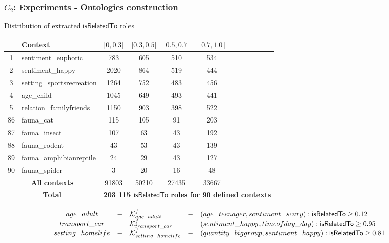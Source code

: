 \begin{frame}
	\frametitle{$C_{2}$: Experiments - Ontologies construction}
	\begin{exampleblock}{Distribution of extracted $\mathsf{isRelatedTo}$ roles}
		 \centering \tiny
		\begin{tabular}{c l c c c c c c c c c c} \hline
		~&\textbf{Context}& $[0, 0.3[$ & $[0.3, 0.5[$ & $[0.5, 0.7[$ & $[0.7, 1.0]$ \\ 
		\hline
			1&sentiment\_euphoric	&783	&605	&510	&534\\
			2&sentiment\_happy		&2020	&864	&519	&444\\
			3&setting\_sportsrecreation&1264	&752	&483	&456\\ 
			4&age\_child		&1045	&649	&493	&441\\ 
			5&relation\_familyfriends	&1150	&903	&398	&522\\ \hline
			86&fauna\_cat	&115	&105	&91	&203\\ 
			87&fauna\_insect		&107	&63	&43	&192\\
			88&fauna\_rodent		&43	&53	&43	&139\\ 
			89&fauna\_amphibianreptile	&24	&29	&43	&127\\ 
			90&fauna\_spider	&3	&20	&16	&48\\ \hline 
			\multicolumn{2}{c}{\textbf{All contexts}}	&91803 	&50210	&27435	&33667\\
			\hline
			\multicolumn{2}{c}{\textbf{Total}}& \multicolumn{10}{c}{\textbf{\alert{203 115} $\mathsf{isRelatedTo}$ 
								roles for 90 defined contexts}}\\ \hline
		\end{tabular}
		
	\end{exampleblock}	
	{\tiny \centering
	\begin{equation*}
			\begin{array}{ c c l c l}
			age\_adult & - &\mathcal{K}^{f}_{age\_adult} 
				& - & (age\_teenager,sentiment\_scary):\mathsf{isRelatedTo} \geq 0.12\\
			transport\_car & - &\mathcal{K}^{f}_{transport\_car}
				& - & (sentiment\_happy,timeofday\_day):\mathsf{isRelatedTo} \geq 0.95\\
			setting\_homelife & - &\mathcal{K}^{f}_{setting\_homelife} 
				& - & (quantity\_biggroup,sentiment\_happy):\mathsf{isRelatedTo} \geq 0.81\\
			\end{array}
	\end{equation*}
	}
		
\end{frame}


